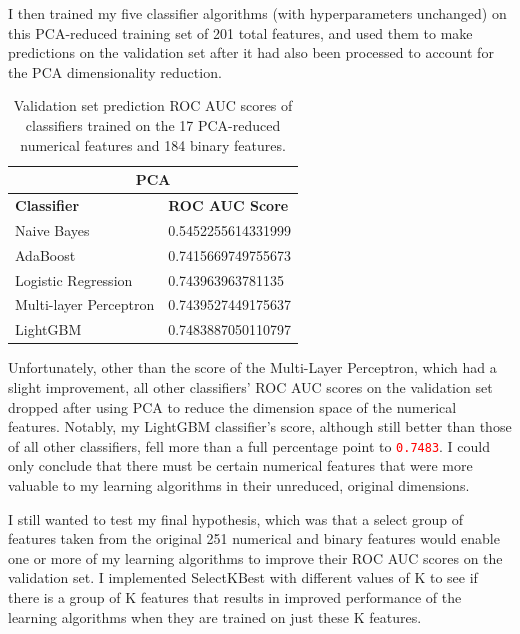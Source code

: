 \documentclass[12pt, letterpaper]{article}
\begin{document}
I then trained my five classifier algorithms (with hyperparameters unchanged) on this PCA-reduced training set of 201 total features, and used them to make predictions on the validation set after it had also been processed to account for the PCA dimensionality reduction.

\begin{table}[ht]
  \centering
  {
  \begin{tabular}{|| l | l ||}
   \hline
   \multicolumn{2}{|c|}{PCA} \\
   \hline
   \rowcolor{white} \textbf{Classifier} & \textbf{ROC AUC Score} \\ [0.5ex]
   \hline\hline
   Naive Bayes & 0.5452255614331999 \\
   \hline
   AdaBoost & 0.7415669749755673 \\
   \hline
   Logistic Regression & 0.743963963781135 \\
   \hline
   Multi-layer Perceptron & 0.7439527449175637 \\
   \hline
   LightGBM & 0.7483887050110797 \\ [1ex]
   \hline
  \end{tabular}
 }
 \caption{Validation set prediction ROC AUC scores of classifiers trained on the 17 PCA-reduced numerical features and 184 binary features.}
 \label{table:2}
\end{table}

Unfortunately, other than the score of the Multi-Layer Perceptron, which had a slight improvement, all other classifiers' ROC AUC scores on the validation set dropped after using PCA to reduce the dimension space of the numerical features. Notably, my LightGBM classifier's score, although still better than those of all other classifiers, fell more than a full percentage point to \colorbox{backcolor}{\textcolor{red}{\texttt{0.7483}}}. I could only conclude that there must be certain numerical features that were more valuable to my learning algorithms in their unreduced, original dimensions.

I still wanted to test my final hypothesis, which was that a select group of features taken from the original 251 numerical and binary features would enable one or more of my learning algorithms to improve their ROC AUC scores on the validation set. I implemented SelectKBest with different values of K to see if there is a group of K features that results in improved performance of the learning algorithms when they are trained on just these K features.
\end{document}
